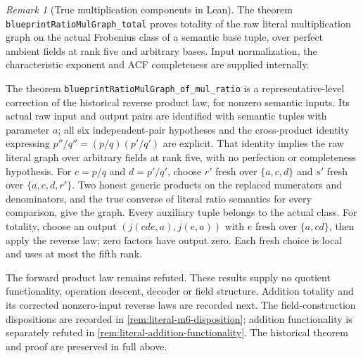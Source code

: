 \documentclass[11pt,oneside]{article}
\theoremstyle{definition}
\theoremstyle{remark}
\newtheorem{remark}[theorem]{Remark}
\newcommand{\lean}[1]{\nolinkurl{#1}}
\begin{document}
\begin{remark}[True multiplication components in Lean]\label{rem:literal-multiplication-laws}
The theorem \lean{blueprintRatioMulGraph_total} proves totality of the raw literal
multiplication graph on the actual Frobenius class of a semantic base tuple, over perfect
ambient fields at rank five and arbitrary bases. Input normalization, the characteristic
exponent and ACF completeness are supplied internally.

The theorem \lean{blueprintRatioMulGraph_of_mul_ratio} is a representative-level
correction of the historical reverse product law, for nonzero semantic inputs. Its
actual raw input and output pairs are identified with semantic tuples with parameter $a$;
all six independent-pair hypotheses and the cross-product identity expressing
$p''/q''=(p/q)(p'/q')$ are explicit. That identity implies the raw literal graph over
arbitrary fields at rank five, with no perfection or completeness hypothesis.
For $c=p/q$ and $d=p'/q'$, choose $r'$ fresh over $\{a,c,d\}$ and $s'$ fresh over
$\{a,c,d,r'\}$. Two honest generic products on the replaced numerators and denominators,
and the true converse of literal ratio semantics for every comparison, give the graph.
Every auxiliary tuple belongs to the actual class. For totality, choose an output
$(j(cde,a),j(e,a))$ with $e$ fresh over $\{a,cd\}$, then apply the reverse law; zero
factors have output zero. Each fresh choice is local and uses at most the fifth rank.

The forward product law remains refuted. These results supply no quotient functionality,
operation descent, decoder or field structure. Addition totality and its corrected
nonzero-input reverse laws are recorded next. The field-construction dispositions are
recorded in \cref{rem:literal-m6-disposition}; addition functionality is separately refuted
in \cref{rem:literal-addition-functionality}.
The historical theorem and proof are preserved in full above.
\end{remark}
\end{document}
